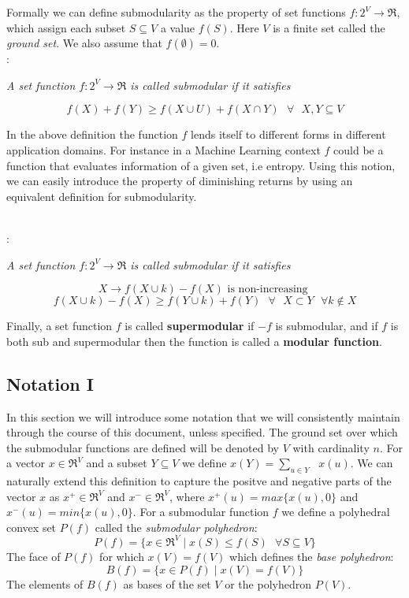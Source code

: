 Formally we can define submodularity as the property of set functions $f:2^V \rightarrow \Re$, which assign each subset $S \subseteq V$ a value $f(S)$. Here $V$ is a finite set called the {\it ground set}. We also assume that $f(\emptyset) = 0$.\\

{\bf {}}: {\it A set function $f:2^V \rightarrow \Re$ is called submodular if it satisfies

\[
 f(X) + f(Y) \geq f(X \cup U) + f(X \cap Y) \text{  } \forall \text{  } X,Y \subseteq V
\]

In the above definition the function $f$ lends itself to different forms in different application domains. For instance in a Machine Learning context $f$ could be a function that evaluates information of a given set, i.e entropy. Using this notion, we can easily introduce the property of diminishing returns by using an equivalent definition for submodularity.}\\

{\bf {}}: {\it A set function $f:2^V \rightarrow \Re$ is called submodular if it satisfies

\[
 X \rightarrow f(X\cup {k}) - f(X) \text{ is non-increasing }
 \]
 \[
 f(X \cup {k}) - f(X) \geq f(Y \cup {k}) + f(Y) \text{  } \forall \text{  } X\subset Y \text{  } \forall k \notin X
\]

Finally, a set function $f$ is called {\bf supermodular} if $-f$ is submodular, and if $f$ is both sub and supermodular then the function is called a {\bf modular function}.}

\subsection{Notation I}
\label{sec:notation}
In this section we will introduce some notation that we will consistently maintain through the course of this document, unless specified. The ground set over which the submodular functions are defined will be denoted by $V$ with cardinality $n$. For a vector $x \in \Re^V$ and a subset $Y \subseteq V$ we define $x(Y) = \underset{u \in Y}{\operatorname{\sum }}\text{ } x(u)$. We can naturally extend this definition to capture the positve and negative parts of the vector $x$ as $x^+\in \Re^V$ and $x^-\in \Re^V$, where $x^+(u) = max\{x(u),0\}$ and $x^-(u) = min\{x(u),0\}$. For a submodular function $f$ we define a polyhedral convex set $P(f)$ called the {\it submodular polyhedron}:
\[
 P(f) = \{ x\in \Re^V \mid x(S) \leq f(S) \text{ }\forall S\subseteq V \}
\]
The face of $P(f)$ for which $x(V) = f(V)$ which defines the {\it base polyhedron}:
\[
 B(f) = \{ x \in P(f) \mid x(V) = f(V)\}
\]
The elements of $B(f)$ as bases of the set $V$ or the polyhedron $P(V)$.


